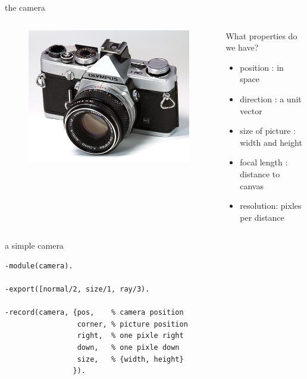 \begin{frame}[fragile]{the camera}


\begin{columns}
 \begin{column}{0.5\linewidth}

\begin{figure}
 \includegraphics[scale=0.4]{olympusom1.jpg}
\end{figure}

 \end{column}

 \begin{column}{0.5\linewidth}
What properties do we have?
  \begin{itemize}
 \pause \item position : in space
 \pause \item direction : a unit vector 
 \pause \item size of picture : width and height
 \pause \item focal length : distance to canvas
 \pause \item resolution: pixles per distance
  \end{itemize}
 \end{column}

\end{columns}

\end{frame}

\begin{frame}[fragile]{a simple camera}

\begin{verbatim}
-module(camera).

-export([normal/2, size/1, ray/3).

-record(camera, {pos,    % camera position
                 corner, % picture position
                 right,  % one pixle right
                 down,   % one pixle down
                 size,   % {width, height}
                }).
\end{verbatim}

\end{frame}



